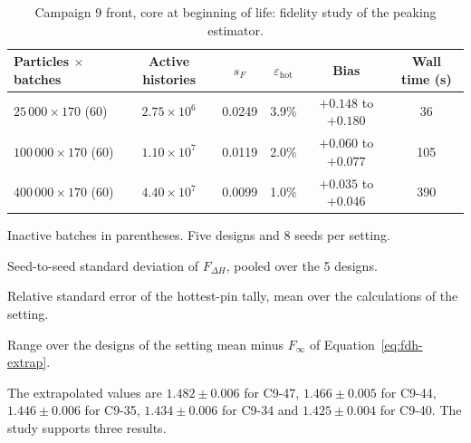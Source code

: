 \begin{table}[htbp]
  \centering
  \begin{threeparttable}
  \caption{Campaign 9 front, core at beginning of life: fidelity study of the peaking estimator.}
  \label{tab:fid-ladder-core}
  \small
  \setlength{\tabcolsep}{4pt}
  \begin{tabular}{@{}lccccc@{}}
    \toprule
    Particles $\times$ batches & Active histories & $s_F$\tnote{a} & $\varepsilon_\mathrm{hot}$\tnote{b} & Bias\tnote{c} & Wall time (s) \\
    \midrule
    $25\,000\times170$ (60)  & $2.75\times10^{6}$ & 0.0249 & 3.9\% & $+0.148$ to $+0.180$ & 36 \\
    $100\,000\times170$ (60) & $1.10\times10^{7}$ & 0.0119 & 2.0\% & $+0.060$ to $+0.077$ & 105 \\
    $400\,000\times170$ (60) & $4.40\times10^{7}$ & 0.0099 & 1.0\% & $+0.035$ to $+0.046$ & 390 \\
    \bottomrule
  \end{tabular}
  \begin{tablenotes}[flushleft]\footnotesize
    \item Inactive batches in parentheses. Five designs and 8 seeds per setting.
    \item[a] Seed-to-seed standard deviation of $F_{\Delta H}$, pooled
      over the 5 designs.
    \item[b] Relative standard error of the hottest-pin tally, mean over
      the calculations of the setting.
    \item[c] Range over the designs of the setting mean minus $F_\infty$ of
      Equation~\eqref{eq:fdh-extrap}.
  \end{tablenotes}
  \end{threeparttable}
\end{table}

The extrapolated values are $1.482 \pm 0.006$ for C9-47,
$1.466 \pm 0.005$ for C9-44, $1.446 \pm 0.006$ for C9-35,
$1.434 \pm 0.006$ for C9-34 and $1.425 \pm 0.004$ for C9-40. The study
supports three results.

